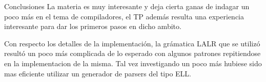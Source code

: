 \documentclass[a4paper,8pt]{article}
\begin{document}
\begin{section}{Conclusiones}
La materia es muy interesante y deja cierta ganas de indagar un poco más en el tema de compiladores, el TP además resulta una experiencia interesante para dar los primeros pasos en dicho ambito.

Con respecto los detalles de la implementación, la grámatica LALR que se utilizó resultó un poco más complicada de lo esperado con algunos patrones repitiendose en la implementacion de la misma. Tal vez investigando un poco más hubiese sido mas eficiente utilizar un generador de parsers del tipo ELL.
\end{section}
\newpage
\end{document}
